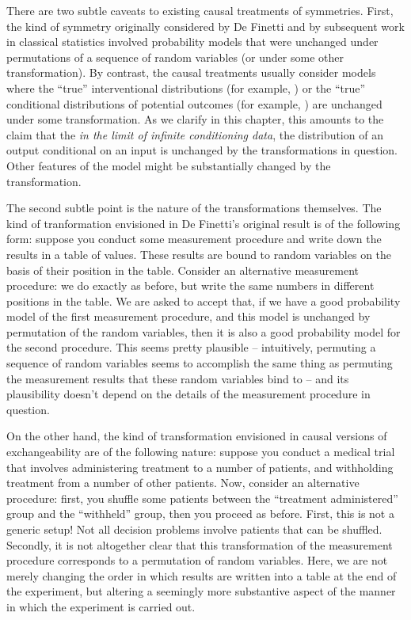 There are two subtle caveats to existing causal treatments of symmetries. First, the kind of symmetry originally considered by De Finetti and by subsequent work in classical statistics involved probability models that were unchanged under permutations of a sequence of random variables (or under some other transformation). By contrast, the causal treatments usually consider models where the ``true'' interventional distributions (for example, \citet{saarela_role_2020}) or the ``true'' conditional distributions of potential outcomes (for example, \citet{hernan_estimating_2006}) are unchanged under some transformation. As we clarify in this chapter, this amounts to the claim that the \emph{in the limit of infinite conditioning data}, the distribution of an output conditional on an input is unchanged by the transformations in question. Other features of the model might be substantially changed by the transformation.

The second subtle point is the nature of the transformations themselves. The kind of tranformation envisioned in De Finetti's original result is of the following form: suppose you conduct some measurement procedure and write down the results in a table of values. These results are bound to random variables on the basis of their position in the table. Consider an alternative measurement procedure: we do exactly as before, but write the same numbers in different positions in the table. We are asked to accept that, if we have a good probability model of the first measurement procedure, and this model is unchanged by permutation of the random variables, then it is also a good probability model for the second procedure. This seems pretty plausible -- intuitively, permuting a sequence of random variables seems to accomplish the same thing as permuting the measurement results that these random variables bind to -- and its plausibility doesn't depend on the details of the measurement procedure in question.

On the other hand, the kind of transformation envisioned in causal versions of exchangeability are of the following nature: suppose you conduct a medical trial that involves administering treatment to a number of patients, and withholding treatment from a number of other patients. Now, consider an alternative procedure: first, you shuffle some patients between the ``treatment administered'' group and the ``withheld'' group, then you proceed as before. First, this is not a generic setup! Not all decision problems involve patients that can be shuffled. Secondly, it is not altogether clear that this transformation of the measurement procedure corresponds to a permutation of random variables. Here, we are not merely changing the order in which results are written into a table at the end of the experiment, but altering a seemingly more substantive aspect of the manner in which the experiment is carried out.

